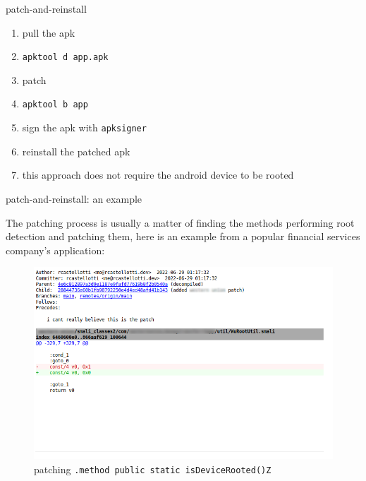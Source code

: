 \documentclass{beamer}
\begin{document}
\begin{frame}{patch-and-reinstall}

    \begin{enumerate}[<+->]
        \item pull the apk
        \item {\footnotesize \texttt{apktool d app.apk}}
        \item patch
        \item {\footnotesize \texttt{apktool b app}}
        \item sign the apk with {\footnotesize \texttt{apksigner}}
        \item reinstall the patched apk
        \item this approach does not require the android device to be rooted 
    \end{enumerate}

\end{frame}

\begin{frame}[fragile]{patch-and-reinstall: an example}

   The patching process is usually a matter of finding the methods performing root detection and patching them, here is an example from a popular financial services company's application:

    \begin{figure}
        \centering \includegraphics[scale=1.2]{patch.png}
        \caption{patching \texttt{.method public static isDeviceRooted()Z} }
    \end{figure}

\end{frame}
\end{document}
